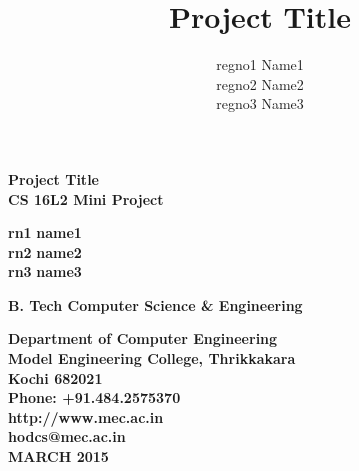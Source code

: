 \documentclass[11pt]{report}
\begin{document}
\renewcommand\bibname{References}
\pagestyle{fancy}
\fancyhead{}
\fancyfoot{}
\fancyfoot[c]{\thepage}
\renewcommand{\chaptermark}[1]{
\markboth{\thechapter.\ #1}{}} 
\renewcommand{\headrulewidth}{0.3pt}
\fancyhead[r]{\slshape \leftmark}
\addtolength{\headheight}{\baselineskip}

\lhead{\nouppercase{\rightmark}}
\rhead{\nouppercase{\leftmark}}
%
\title {Project Title}
\author {regno1 Name1 \\ regno2 Name2 \\ regno3 Name3  }

\begin{titlepage}
\begin{center}

\Huge{\textbf{Project Title}}\\
\vspace{0.05in}
\large{\textbf{CS 16L2 Mini Project\\}}
\vspace{1.2in}



\begin{center}

\Large{\textbf{rn1}}  \Large{\textbf{name1}}\\ 
\Large{\textbf{rn2}}  \Large{\textbf{name2}}\\ 
\Large{\textbf{rn3}}  \Large{\textbf{name3}}\\

\end{center}

\Large{\textbf{
B. Tech Computer Science \& Engineering
}}


\vspace{2.0in}
\begin{figure}[h]
\begin{center}

\end{center}
\end{figure}
\textbf{
Department of Computer Engineering\\
Model Engineering College, Thrikkakara\\
Kochi 682021\\
Phone: +91.484.2575370\\
http://www.mec.ac.in\\
hodcs@mec.ac.in\\
\vspace{.2in}
{\footnotesize MARCH 2015}
}
\end{center}
\end{titlepage}
\end{document}
